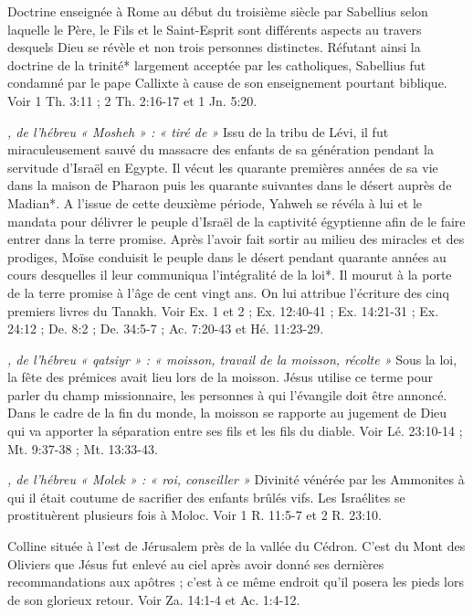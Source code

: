 \begin{multicols}{2}
\textit{}\newline
Doctrine enseignée à Rome au début du troisième siècle par Sabellius selon laquelle le Père, le Fils et le Saint-Esprit sont différents aspects au travers desquels Dieu se révèle et non trois personnes distinctes. Réfutant ainsi la doctrine de la trinité* largement acceptée par les catholiques, Sabellius fut condamné par le pape Callixte à cause de son enseignement pourtant biblique. Voir 1 Th. 3:11 ; 2 Th. 2:16-17 et 1 Jn. 5:20.

\textit{, de l'hébreu « Mosheh » : « tiré de »}\newline
Issu de la tribu de Lévi, il fut miraculeusement sauvé du massacre des enfants de sa génération pendant la servitude d'Israël en Egypte. Il vécut les quarante premières années de sa vie dans la maison de Pharaon puis les quarante suivantes dans le désert auprès de Madian*. A l'issue de cette deuxième période, Yahweh se révéla à lui et le mandata pour délivrer le peuple d'Israël de la captivité égyptienne afin de le faire entrer dans la terre promise. Après l'avoir fait sortir au milieu des miracles et des prodiges, Moïse conduisit le peuple dans le désert pendant quarante années au cours desquelles il leur communiqua l'intégralité de la loi*. Il mourut à la porte de la terre promise à l'âge de cent vingt ans. On lui attribue l'écriture des cinq premiers livres du Tanakh. Voir Ex. 1 et 2 ; Ex. 12:40-41 ; Ex. 14:21-31 ; Ex. 24:12 ; De. 8:2 ; De. 34:5-7 ; Ac. 7:20-43 et Hé. 11:23-29.

\textit{, de l'hébreu « qatsiyr » : « moisson, travail de la moisson, récolte »}\newline
Sous la loi, la fête des prémices avait lieu lors de la moisson. Jésus utilise ce terme pour parler du champ missionnaire, les personnes à qui l'évangile doit être annoncé. Dans le cadre de la fin du monde, la moisson se rapporte au jugement de Dieu qui va apporter la séparation entre ses fils et les fils du diable. Voir Lé. 23:10-14 ; Mt. 9:37-38 ; Mt. 13:33-43.

\textit{, de l'hébreu « Molek » : « roi, conseiller »}\newline
Divinité vénérée par les Ammonites à qui il était coutume de sacrifier des enfants brûlés vifs. Les Israélites se prostituèrent plusieurs fois à Moloc. Voir 1 R. 11:5-7 et 2 R. 23:10.

\textit{}\newline
Colline située à l'est de Jérusalem près de la vallée du Cédron. C'est du Mont des Oliviers que Jésus fut enlevé au ciel après avoir donné ses dernières recommandations aux apôtres ; c'est à ce même endroit qu'il posera les pieds lors de son glorieux retour. Voir Za. 14:1-4 et Ac. 1:4-12.


\end{multicols}
